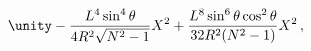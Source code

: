 \begin{equation}
\unity-\frac{L^4\sin^4{\theta}}{4R^2\sqrt{N^2-1}}X^2+\frac{L^8\sin^6{\theta}\cos^2{\theta}}
{32R^2(N^2-1)}X^2\, ,
\end{equation}

